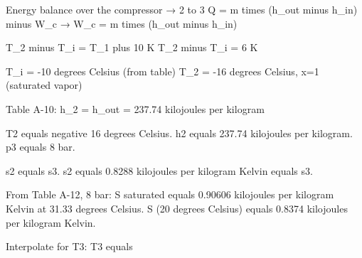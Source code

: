 Energy balance over the compressor → 2 to 3  
Q = m times (h_out minus h_in) minus W_c  
→ W_c = m times (h_out minus h_in)  

T_2 minus T_i = T_1 plus 10 K  
T_2 minus T_i = 6 K  

T_i = -10 degrees Celsius (from table)  
T_2 = -16 degrees Celsius, x=1 (saturated vapor)  

Table A-10: h_2 = h_out = 237.74 kilojoules per kilogram

T2 equals negative 16 degrees Celsius.  
h2 equals 237.74 kilojoules per kilogram.  
p3 equals 8 bar.  

s2 equals s3.  
s2 equals 0.8288 kilojoules per kilogram Kelvin equals s3.  

From Table A-12, 8 bar:  
S saturated equals 0.90606 kilojoules per kilogram Kelvin at 31.33 degrees Celsius.  
S (20 degrees Celsius) equals 0.8374 kilojoules per kilogram Kelvin.  

Interpolate for T3:  
T3 equals